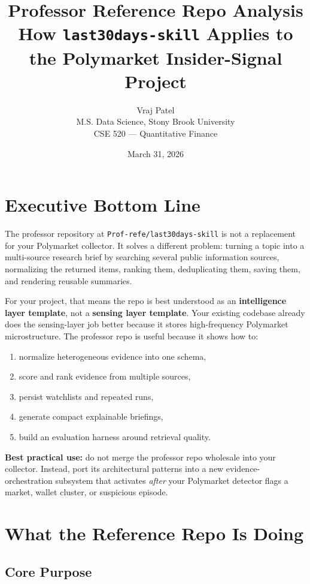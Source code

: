 \documentclass[11pt, letterpaper]{article}
\title{
    \textbf{Professor Reference Repo Analysis} \\[0.4em]
    \Large How \texttt{last30days-skill} Applies to the Polymarket Insider-Signal Project
}
\author{
    Vraj Patel \\
    M.S. Data Science, Stony Brook University \\
    CSE 520 --- Quantitative Finance
}
\date{March 31, 2026}
\begin{document}
\maketitle
\tableofcontents
\newpage

\section{Executive Bottom Line}

The professor repository at \texttt{Prof-refe/last30days-skill} is not a replacement for your Polymarket collector. It solves a different problem: turning a topic into a multi-source research brief by searching several public information sources, normalizing the returned items, ranking them, deduplicating them, saving them, and rendering reusable summaries.

For your project, that means the repo is best understood as an \textbf{intelligence layer template}, not a \textbf{sensing layer template}. Your existing codebase already does the sensing-layer job better because it stores high-frequency Polymarket microstructure. The professor repo is useful because it shows how to:

\begin{enumerate}[nosep]
    \item normalize heterogeneous evidence into one schema,
    \item score and rank evidence from multiple sources,
    \item persist watchlists and repeated runs,
    \item generate compact explainable briefings,
    \item build an evaluation harness around retrieval quality.
\end{enumerate}

\textbf{Best practical use:} do not merge the professor repo wholesale into your collector. Instead, port its architectural patterns into a new evidence-orchestration subsystem that activates \emph{after} your Polymarket detector flags a market, wallet cluster, or suspicious episode.

\section{What the Reference Repo Is Doing}

\subsection{Core Purpose}
\end{document}
